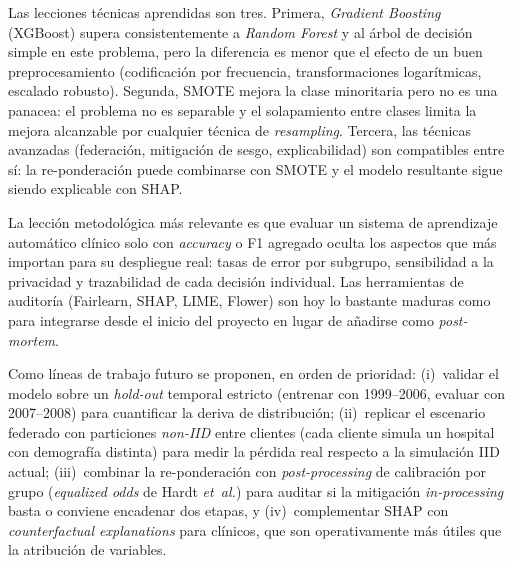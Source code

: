 \documentclass[11pt,a4paper]{article}
\begin{document}
Las lecciones técnicas aprendidas son tres. Primera, \textit{Gradient Boosting} (XGBoost) supera consistentemente a \textit{Random Forest} y al árbol de decisión simple en este problema, pero la diferencia es menor que el efecto de un buen preprocesamiento (codificación por frecuencia, transformaciones logarítmicas, escalado robusto). Segunda, SMOTE mejora la clase minoritaria pero no es una panacea: el problema no es separable y el solapamiento entre clases limita la mejora alcanzable por cualquier técnica de \textit{resampling}. Tercera, las técnicas avanzadas (federación, mitigación de sesgo, explicabilidad) son compatibles entre sí: la re-ponderación puede combinarse con SMOTE y el modelo resultante sigue siendo explicable con SHAP.

La lección metodológica más relevante es que evaluar un sistema de aprendizaje automático clínico solo con \textit{accuracy} o F1 agregado oculta los aspectos que más importan para su despliegue real: tasas de error por subgrupo, sensibilidad a la privacidad y trazabilidad de cada decisión individual. Las herramientas de auditoría (Fairlearn, SHAP, LIME, Flower) son hoy lo bastante maduras como para integrarse desde el inicio del proyecto en lugar de añadirse como \textit{post-mortem}.

Como líneas de trabajo futuro se proponen, en orden de prioridad: (i)~validar el modelo sobre un \textit{hold-out} temporal estricto (entrenar con 1999--2006, evaluar con 2007--2008) para cuantificar la deriva de distribución; (ii)~replicar el escenario federado con particiones \textit{non-IID} entre clientes (cada cliente simula un hospital con demografía distinta) para medir la pérdida real respecto a la simulación IID actual; (iii)~combinar la re-ponderación con \textit{post-processing} de calibración por grupo (\textit{equalized odds} de Hardt \emph{et~al.}) para auditar si la mitigación \textit{in-processing} basta o conviene encadenar dos etapas, y (iv)~complementar SHAP con \textit{counterfactual explanations} para clínicos, que son operativamente más útiles que la atribución de variables.


\end{document}
